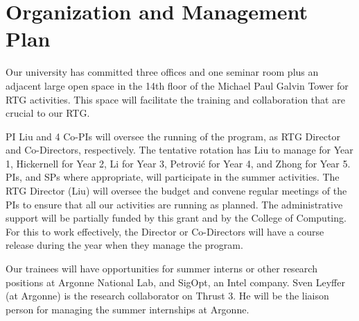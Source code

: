 \documentclass[11pt]{NSFamsart}
\begin{document}
{%
\section{Organization and Management Plan }
 
 \iffalse
 Provide evidence of past success in training undergraduates, graduate students, and postdocs, identifying names, degree dates, and subsequent placement (including the flow of undergraduates into graduate programs). Applicants may refer to Trainee Data in supplemental documents, if included. Describe the plans, procedures, and personnel for the development and monitoring of all aspects of the project. In particular, discuss plans to ensure appropriate mentoring of students and postdoctoral associates, as well as the roles of the faculty involved. Provide evidence of faculty commitment necessary for the implementation of the proposed program. If the project involves international collaborations, industrial internships, or arrangements with government laboratories, businesses, or other departments, then the proposal should document existing arrangements, any plans for expanding these arrangements, and the personnel involved in managing these linkages.  
 \fi
 
Our university has committed three offices and one seminar room plus an adjacent large open space in the 14th floor of the Michael Paul Galvin Tower for RTG activities. This space will facilitate the training and collaboration that are crucial to our RTG.
 
PI Liu and 4 Co-PIs will oversee the running of the program, as RTG Director  and Co-Directors, respectively.  The tentative rotation has Liu to manage for Year 1, Hickernell for Year 2,    Li for  Year 3, Petrovi\'{c} for Year 4,     and Zhong for Year 5.    PIs, and SPs where appropriate, will participate in the summer activities.
The RTG Director (Liu) will oversee the budget and convene regular meetings of the PIs to ensure that all our activities are running as planned. %
The administrative support will be partially funded by this grant and by the College of Computing. 
For this to work effectively, the Director or Co-Directors will have a course release during the year when they manage the program.


Our trainees will have opportunities for summer interns or other research positions at Argonne National Lab, and SigOpt, an Intel company. %
 Sven Leyffer (at Argonne) is the research collaborator on Thrust 3.  He will be the liaison person for managing the summer internships at Argonne. %

}
\end{document}
